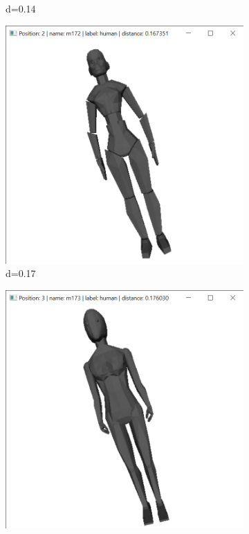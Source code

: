\documentclass{bigdata}
\begin{document}
\begin{figure}[h!]
\begin{subfigure}[b]{0.09\linewidth}
    \caption*{d=0.14}
  \end{subfigure}
  \begin{subfigure}[b]{0.09\linewidth}
    \includegraphics[width=\linewidth]{Pictures/Evaluation/m134/pos2.png}
    \caption*{d=0.17}
  \end{subfigure}
  \begin{subfigure}[b]{0.09\linewidth}
    \includegraphics[width=\linewidth]{Pictures/Evaluation/m134/pos3.png}

\end{subfigure}
\end{figure}
\end{document}
